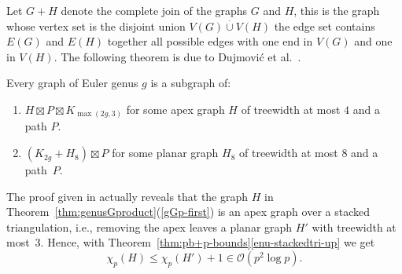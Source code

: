 Let $G+H$ denote the complete join of the graphs $G$ and $H$, this is the
graph whose vertex set is the disjoint union $V(G) \overset{\cdot}{\cup} V(H)$
the edge set contains $E(G)$ and $E(H)$ together all possible edges with one
end in $V(G)$ and one in $V(H)$.  The following theorem is due to
Dujmovi\'c et al.\ \cite{DJMMUW-queues}. 

\begin{theorem}
\label{thm:genusGproduct}
Every graph of Euler genus $g$ is a subgraph of:
\begin{enumerate}
\item\label{gGp-first}
  $H\boxtimes P \boxtimes K_{\max(2g,3)}$ for some apex graph $H$ of
  treewidth at most $4$ and a path $P$.
\item\label{gGp-second}
  $(K_{2g}+H_8)\boxtimes P$ for some planar graph $H_8$ of treewidth at
  most $8$ and a path~$P$.
\end{enumerate}
\end{theorem}

The proof given in  \cite{DJMMUW-queues} actually reveals that
the graph $H$ in Theorem~\ref{thm:genusGproduct}(\ref{gGp-first})
is an apex graph over a stacked triangulation, i.e., removing the apex 
leaves a planar graph $H'$ with treewidth at most~3. Hence, with
Theorem~\ref{thm:pb+p-bounds}\ref{enu-stackedtri-up} we get
\begin{equation}
\chi_p(H) \leq \chi_p(H')+1 \in  \mathcal{O}(p^2 \log p). \tag{$*$}\label{Hprime}
\end{equation}

